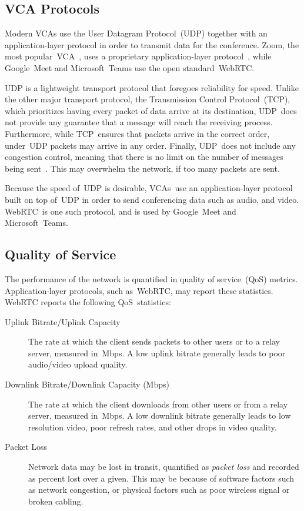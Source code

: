     \subsection{VCA Protocols}\label{introduction:qos:udp}
        Modern VCAs use the User Datagram Protocol~(UDP) together with an application-layer protocol in order to transmit data for the conference. Zoom, the most popular~VCA~\autocite{kim2021}, uses a proprietary application-layer protocol~\autocite{marczak2020}, while Google~Meet and Microsoft~Teams use the open standard~WebRTC.

        UDP is a lightweight transport protocol that foregoes reliability for speed. Unlike the other major transport protocol, the Transmission Control Protocol~(TCP), which prioritizes having every packet of data arrive at its destination, UDP~does not provide any guarantee that a message will reach the receiving process. Furthermore, while TCP~ensures that packets arrive in the correct order, under~UDP packets may arrive in any order. Finally, UDP~does not include any congestion control, meaning that there is no limit on the number of messages being sent~\autocite{alma990025667610203776}. This may overwhelm the network, if too many packets are sent.

        Because the speed of~UDP is desirable, VCAs~use an application-layer protocol built on top of~UDP in order to send conferencing data such as audio, and video. WebRTC~is one such protocol, and is used by Google~Meet and Microsoft~Teams. %

    \subsection{Quality of Service}\label{introduction:qos}
        The performance of the network is quantified in quality of service~(QoS) metrics. Application-layer protocols, such as~WebRTC, may report these statistics. WebRTC reports the following QoS~statistics:

        \begin{description}
            \item[Uplink Bitrate/Uplink Capacity] The rate at which the client sends packets to other users or to a relay server, measured in~Mbps. A low uplink bitrate generally leads to poor audio/video upload quality.

            \item[Downlink Bitrate/Downlink Capacity (Mbps)] The rate at which the client downloads from other users or from a relay server, measured in~Mbps. A low downlink bitrate generally leads to low resolution video, poor refresh rates, and other drops in video quality.

            \item[Packet Loss] Network data may be lost in transit, quantified as \emph{packet loss} and recorded as percent lost over a given. This may be because of software factors such as network congestion, or physical factors such as poor wireless signal or broken cabling.
        \end{description}

